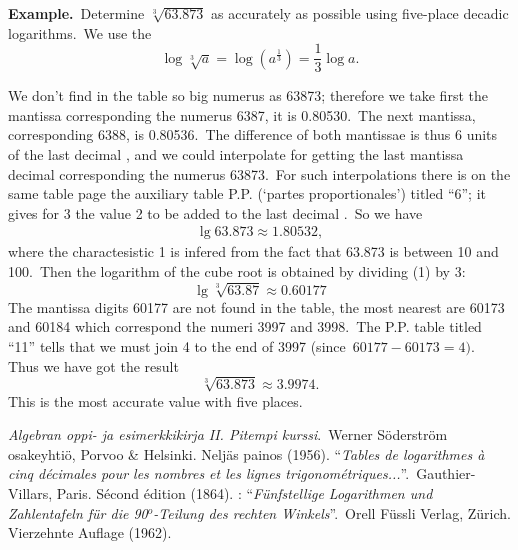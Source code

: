 \documentclass[12pt]{article}
\theoremstyle{definition}
\begin{document}
\textbf{Example.}\, Determine $\sqrt[3]{63.873}$ as accurately as possible using five-place decadic logarithms.\, We use the 
$$\log\sqrt[3]{a} = \log{(a^\frac{1}{3})} = \frac{1}{3}\log{a}.$$

We don't find in the table so big numerus as 63873; therefore we take first the mantissa corresponding the numerus 6387, it is 0.80530.\, The next mantissa, corresponding 6388, is 0.80536.\, The difference of both mantissae is thus 6 units of the last decimal , and we could interpolate for getting the last mantissa decimal corresponding the numerus 63873.\, For such interpolations there is on the same table page the auxiliary table P.P. (`partes proportionales') titled ``6''; it gives for 3 the value 2 to be added to the last decimal .\, So we have
\begin{align}
\lg{63.873} \approx 1.80532,
\end{align}
where the charactesistic 1 is infered from the fact that 63.873 is between 10 and 100.\, Then the logarithm of the cube root is obtained by dividing (1) by 3:
$$\lg{\sqrt[3]{63.87}} \approx 0.60177$$
The mantissa digits 60177 are not found in the table, the most nearest are 60173 and 60184 which correspond the numeri 3997 and 3998.\, The P.P. table titled ``11'' tells that we must join 4 to the end of 3997 (since\, 
$60177\!-\!60173 = 4)$.\, Thus we have got the result
$$\sqrt[3]{63.873} \approx 3.9974.$$
This is the most accurate value with five places.


\begin{thebibliography}{9}
 {\em Algebran oppi- ja esimerkkikirja II.  Pitempi kurssi}.\, Werner S\"oderstr\"om osakeyhti\"o, Porvoo \& Helsinki. Nelj\"as painos (1956).
 ``{\em Tables de logarithmes \`a cinq d\'ecimales pour les nombres et les lignes trigonom\'etriques...}''.\, Gauthier-Villars, Paris. S\'econd \'edition (1864).
: ``{\em F\"unfstellige Logarithmen und Zahlentafeln f\"ur die 90$^o$-Teilung des rechten Winkels}''.\, Orell F\"ussli Verlag, Z\"urich. Vierzehnte Auflage (1962).
\end{thebibliography}
\end{document}
